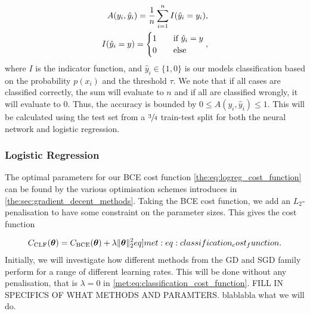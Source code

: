     \begin{align}
        A(y_i, \hat{y}_i) = \frac{1}{n}\sum_{i=1}^{n} I(\hat{y}_i = y_i), \\
        I(\hat{y}_i = y) = \begin{cases}
            1\hspace{10px}&\text{if }\hat{y}_i = y \\
            0\hspace{10px}&\text{else}
        \end{cases} \nonumber,
    \end{align}
    where $I$ is the indicator function, and $\hat{y}_i \in \{ 1, 0\}$ is our models classification based on the probability $p(x_i)$ and the threshold $\tau$. We note that if all cases are classified correctly, the sum will evaluate to $n$ and if all are classified wrongly, it will evaluate to 0. Thus, the accuracy is bounded by $0 \leq A(y_i, \hat{y}_i) \leq 1$. This will be calculated using the test set from a $\sfrac{3}{4}$ train-test split for both the neural network and logistic regression.

    \subsubsection{Logistic Regression}
    The optimal parameters for our BCE cost function \cref{the:eq:logreg_cost_function} can be found by the various optimisation schemes introduces in \cref{the:sec:gradient_decent_methods}. Taking the BCE cost function, we add an $L_2$-penalisation to have some constraint on the parameter sizes. This gives the cost function

    \begin{align}
        \msub{C}{CLF}(\vec{\theta}) = \msub{C}{BCE}(\vec{\theta}) +  \lambda\norm[2]{\vec{\theta}}^2
        \label[eq]{met:eq:classification_cost_function}.
    \end{align}
    Initially, we will investigate how different methods from the GD and SGD family perform for a range of different learning rates. This will be done without any penalisation, that is $\lambda = 0$ in \cref{met:eq:classification_cost_function}. FILL IN SPECIFICS OF WHAT METHODS AND PARAMTERS. blablabla what we will do.


